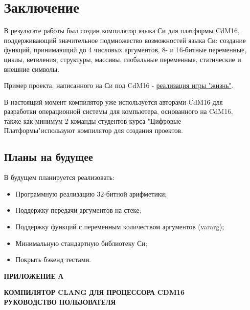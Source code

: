 \documentclass[a4paper,14pt]{extarticle}
\begin{document}
\clearpage
\section{Заключение}

В результате работы был создан компилятор языка Си для платформы CdM16, поддерживающий значительное подмножество возможностей языка Си: создание функций, принимающий до 4 числовых аргументов, 8- и 16-битные переменные, циклы, ветвления, структуры, массивы, глобальные переменные, статические и внешние символы.

Пример проекта, написанного на Си под CdM16 - \href{https://github.com/leadpogrommer/llvm-project-cdm/tree/backend/cdm/llvm/test_cdm/life_multifile}{реализация игры "жизнь"}.

В настоящий момент компилятор уже используется авторами CdM16 для разработки операционной системы для компьютера, основанного на CdM16\cite{cdm:coconut}, также как минимум 2 команды студентов курса "Цифровые Платформы"\allowbreak используют компилятор для создания проектов.

\subsection{Планы на будущее}

В будущем планируется реализовать:
\begin{itemize}
	\item Программную реализацию 32-битной арифметики;
	\item Поддержку передачи аргументов на стеке;
	\item Поддержку функций с переменным количеством аргументов (vararg);
	\item Минимальную стандартную библиотеку Си;
	\item Покрыть бэкенд тестами.
\end{itemize}


\pagebreak
\printbibliography
{}


\newpage
\begin{center}
	\textbf{\large ПРИЛОЖЕНИЕ А}
\end{center}
\vspace*{\fill}
	\begin{center}
		\textbf{\large КОМПИЛЯТОР CLANG ДЛЯ ПРОЦЕССОРА CDM16\\РУКОВОДСТВО ПОЛЬЗОВАТЕЛЯ}
	\end{center}
\vspace*{\fill}
\newpage
\setcounter{section}{0}
\end{document}
